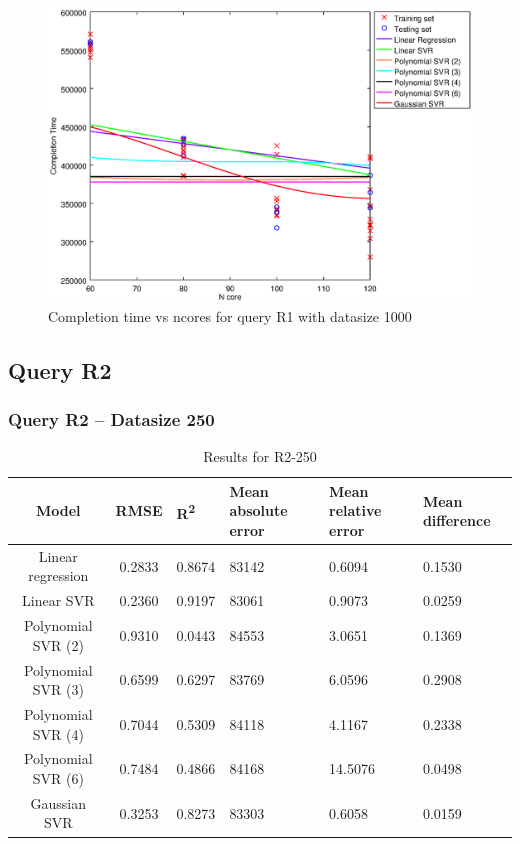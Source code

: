 \documentclass[a4paper,11pt]{article}
\begin{document}
\begin {figure}[hbtp]
\centering
\includegraphics[width=\textwidth]{output/R1_1000_LINEAR_NCORE/plot_R1_1000.eps}
\caption{Completion time vs ncores for query R1 with datasize 1000}
\label{fig:all_linear_R1_1000}
\end {figure}

\newpage
\subsection{Query R2}
\subsubsection{Query R2 -- Datasize 250}
\begin{table}[H]
	\centering
	\begin{adjustbox}{center}
		\begin{tabular}{c | c M{1.2cm} M{2.5cm} M{2.5cm} M{1.8cm}}
			Model & RMSE & R\textsuperscript{2} & Mean absolute error & Mean relative error & Mean difference \tabularnewline
			\hline
			Linear regression & 0.2833 & 0.8674 &  83142 & 0.6094 & 0.1530 \\
			Linear SVR & 0.2360 & 0.9197 &  83061 & 0.9073 & 0.0259 \\
			Polynomial SVR (2) & 0.9310 & 0.0443 &  84553 & 3.0651 & 0.1369 \\
			Polynomial SVR (3) & 0.6599 & 0.6297 &  83769 & 6.0596 & 0.2908 \\
			Polynomial SVR (4) & 0.7044 & 0.5309 &  84118 & 4.1167 & 0.2338 \\
			Polynomial SVR (6) & 0.7484 & 0.4866 &  84168 & 14.5076 & 0.0498 \\
			Gaussian SVR & 0.3253 & 0.8273 &  83303 & 0.6058 & 0.0159 \\
		\end{tabular}
	\end{adjustbox}
	\\
	\caption{Results for R2-250}
	\label{fig:all_linear_R2_250}
\end{table}
\end{document}
